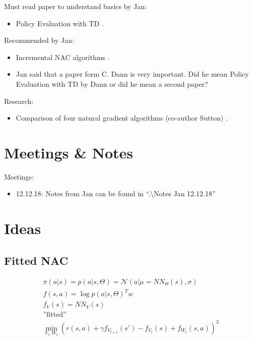 \noindent Must read paper to understand basics by Jan:
\begin{itemize}
	\item Policy Evaluation with TD \cite{dann2014policy}.
\end{itemize}

\noindent Recommended by Jan:
\begin{itemize}
	\item Incremental NAC algorithms \cite{bhatnagar2008incremental}.
	\item Jan said that a paper form C. Dann is very important. Did he mean Policy Evaluation with TD by Dann or did he mean a second paper?
\end{itemize}

\noindent Research:
\begin{itemize}
	\item Comparison of four natural gradient algorithms (co-author Sutton) \cite{bhatnagar2009natural}.
\end{itemize}

\section{Meetings \& Notes}

Meetings:
\begin{itemize}
	\item 12.12.18: Notes from Jan can be found in ``.\textbackslash Notes Jan 12.12.18''
\end{itemize}


\section{Ideas}
\subsection{Fitted NAC}

\begin{align}
	\pi(a|s) = p(a|s, \Theta) = \mathcal{N}(a|\mu = NN_{\Theta}(s), \sigma) \\
	f(s,a) = \log p(a|s, \Theta)^T w \\
	f_V(s) = NN_V(s) \\
	\text{''fitted''}\\
	\min_{V_t, W_t} (r(s,a) + \gamma f_{V_{t+1}}(s') - f_{V_t}(s) + f_{W_t}(s,a))^2
\end{align}



